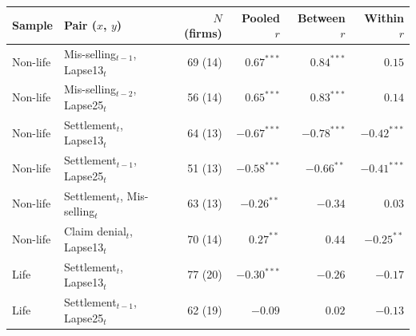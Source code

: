 \begin{tabular}{llrrrr}
\toprule
Sample & Pair ($x$, $y$) & $N$ (firms) & Pooled $r$ & Between $r$ & Within $r$ \\
\midrule
Non-life & Mis-selling$_{t-1}$, Lapse13$_t$ & 69 (14) & $0.67^{***}$ & $0.84^{***}$ & $0.15$ \\
Non-life & Mis-selling$_{t-2}$, Lapse25$_t$ & 56 (14) & $0.65^{***}$ & $0.83^{***}$ & $0.14$ \\
Non-life & Settlement$_t$, Lapse13$_t$ & 64 (13) & $-0.67^{***}$ & $-0.78^{***}$ & $-0.42^{***}$ \\
Non-life & Settlement$_{t-1}$, Lapse25$_t$ & 51 (13) & $-0.58^{***}$ & $-0.66^{**}$ & $-0.41^{***}$ \\
Non-life & Settlement$_t$, Mis-selling$_t$ & 63 (13) & $-0.26^{**}$ & $-0.34$ & $0.03$ \\
Non-life & Claim denial$_t$, Lapse13$_t$ & 70 (14) & $0.27^{**}$ & $0.44$ & $-0.25^{**}$ \\
Life & Settlement$_t$, Lapse13$_t$ & 77 (20) & $-0.30^{***}$ & $-0.26$ & $-0.17$ \\
Life & Settlement$_{t-1}$, Lapse25$_t$ & 62 (19) & $-0.09$ & $0.02$ & $-0.13$ \\
\bottomrule
\end{tabular}